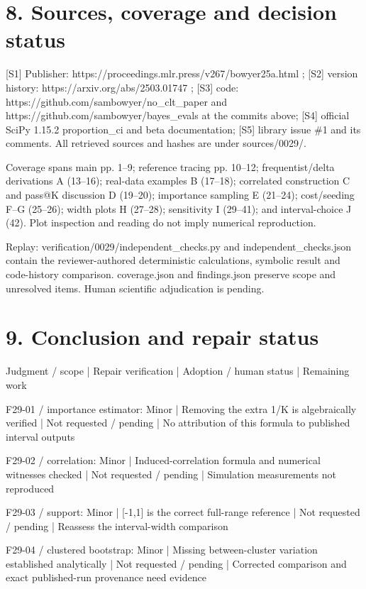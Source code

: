 \documentclass[10pt]{article}
\begin{document}
\section*{8. Sources, coverage and decision status}
[S1] Publisher: https://proceedings.mlr.press/v267/bowyer25a.html ; [S2] version history: https://arxiv.org/abs/2503.01747 ; [S3] code: https://github.com/sambowyer/no\_clt\_paper and https://github.com/sambowyer/bayes\_evals at the commits above; [S4] official SciPy 1.15.2 proportion\_ci and beta documentation; [S5] library issue \#1 and its comments. All retrieved sources and hashes are under sources/0029/.\par
Coverage spans main pp. 1–9; reference tracing pp. 10–12; frequentist/delta derivations A (13–16); real-data examples B (17–18); correlated construction C and pass@K discussion D (19–20); importance sampling E (21–24); cost/seeding F–G (25–26); width plots H (27–28); sensitivity I (29–41); and interval-choice J (42). Plot inspection and reading do not imply numerical reproduction.\par
Replay: verification/0029/independent\_checks.py and independent\_checks.json contain the reviewer-authored deterministic calculations, symbolic result and code-history comparison. coverage.json and findings.json preserve scope and unresolved items. Human scientific adjudication is pending.\par
\section*{9. Conclusion and repair status}
Judgment / scope | Repair verification | Adoption / human status | Remaining work\par
F29-01 / importance estimator: Minor | Removing the extra 1/K is algebraically verified | Not requested / pending | No attribution of this formula to published interval outputs\par
F29-02 / correlation: Minor | Induced-correlation formula and numerical witnesses checked | Not requested / pending | Simulation measurements not reproduced\par
F29-03 / support: Minor | [-1,1] is the correct full-range reference | Not requested / pending | Reassess the interval-width comparison\par
F29-04 / clustered bootstrap: Minor | Missing between-cluster variation established analytically | Not requested / pending | Corrected comparison and exact published-run provenance need evidence\par
\end{document}
